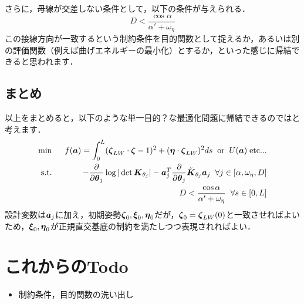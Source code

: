 \documentclass[11pt]{jsarticle}
\begin{document}
			さらに，母線が交差しない条件として，以下の条件が与えられる．
			\begin{equation}\label{eq:D_ineq}
				D<\frac{\cos \alpha}{\alpha'+\omega_{\eta}}
			\end{equation}
			この接線方向が一致するという制約条件を目的関数として捉えるか，あるいは別の評価関数（例えば曲げエネルギーの最小化）とするか，といった感じに帰結できると思われます．
			\subsection{まとめ}
				以上をまとめると，以下のような単一目的？な最適化問題に帰結できるのではと考えます．
				\begin{eqnarray}
					\min \;\; &&f(\boldsymbol{a}) = \int_{0}^{L} (\boldsymbol{\zeta}_{LW} \cdot \boldsymbol{\zeta} -1 )^2 + (\boldsymbol{\eta} \cdot \boldsymbol{\zeta}_{LW})^2 ds \;\; \mathrm{or} \;\; U(\boldsymbol{a})\; \mathrm{etc...} \\
					 \mathrm{s.t.} \;\;&& -\frac{\partial }{\partial \boldsymbol{\theta}_{j}}\log|\det \boldsymbol{K}_{\theta_{j}}| - \boldsymbol{a}_j^T \frac{\partial }{\partial \boldsymbol{\theta}_{j}} \tilde{\boldsymbol{K}}_{\theta_{j}} \boldsymbol{a}_j \;\; \forall j \in [\alpha,\omega_{\eta},D] \\
					 && D<\frac{\cos \alpha}{\alpha'+\omega_{\eta}} \;\; \forall s \in [0,L]
				\end{eqnarray}
				設計変数は$ \boldsymbol{a}_j$に加え，初期姿勢$ \boldsymbol{\zeta}_0,\boldsymbol{\xi}_0,\boldsymbol{\eta}_0 $だが，$ \boldsymbol{\zeta}_0 = \boldsymbol{\zeta}_{LW}(0) $と一致させればよいため，$ \boldsymbol{\xi}_0,\boldsymbol{\eta}_0 $が正規直交基底の制約を満たしつつ表現されればよい．
	\section{これからのTodo}
			\begin{itemize}
				\item 制約条件，目的関数の洗い出し
			\end{itemize}
			
	\newpage
\vspace{10cm}
	

\vspace{14cm}
	\articleSPRfour
	\articleSPRfive
\end{document}
